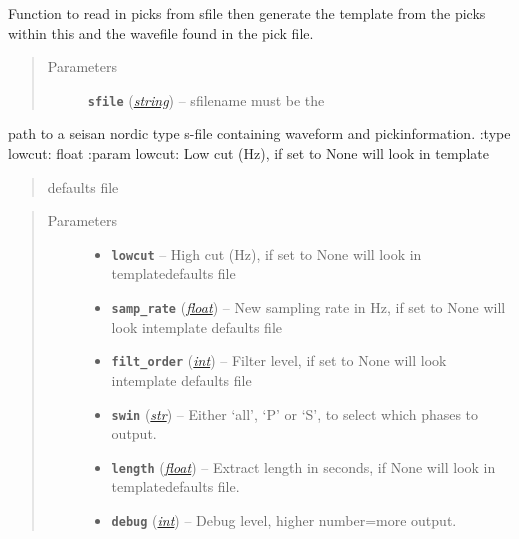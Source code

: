 \documentclass[a4paper,10pt,english]{sphinxmanual}
\begin{document}
\begin{fulllineitems}
\label{submodules/core.template_gen:template_gen.from_sfile}
Function to read in picks from sfile then generate the template from the
picks within this and the wavefile found in the pick file.
\begin{quote}\begin{description}
\item[{Parameters}] \leavevmode
\textbf{\texttt{sfile}} (\href{https://docs.python.org/library/string.html\#module-string}{\emph{string}}) -- sfilename must be the

\end{description}\end{quote}

path to a seisan nordic type s-file containing waveform and pickinformation.
:type lowcut: float
:param lowcut: Low cut (Hz), if set to None will look in template
\begin{quote}

defaults file
\end{quote}
\begin{quote}\begin{description}
\item[{Parameters}] \leavevmode\begin{itemize}
\item {} 
\textbf{\texttt{lowcut}} -- High cut (Hz), if set to None will look in templatedefaults file

\item {} 
\textbf{\texttt{samp\_rate}} (\href{https://docs.python.org/library/functions.html\#float}{\emph{float}}) -- New sampling rate in Hz, if set to None will look intemplate defaults file

\item {} 
\textbf{\texttt{filt\_order}} (\href{https://docs.python.org/library/functions.html\#int}{\emph{int}}) -- Filter level, if set to None will look intemplate defaults file

\item {} 
\textbf{\texttt{swin}} (\href{https://docs.python.org/library/functions.html\#str}{\emph{str}}) -- Either `all', `P' or `S', to select which phases to output.

\item {} 
\textbf{\texttt{length}} (\href{https://docs.python.org/library/functions.html\#float}{\emph{float}}) -- Extract length in seconds, if None will look in templatedefaults file.

\item {} 
\textbf{\texttt{debug}} (\href{https://docs.python.org/library/functions.html\#int}{\emph{int}}) -- Debug level, higher number=more output.

\end{itemize}

\end{description}\end{quote}

\end{fulllineitems}
\end{document}
